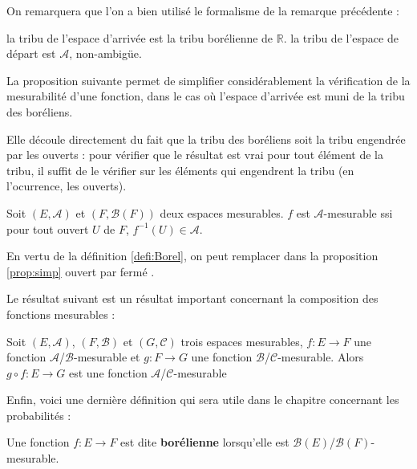 \documentclass[../integ-proba.tex]{subfiles}
\begin{document}
\begin{rem}
  On remarquera que l'on a bien utilisé le formalisme de la remarque précédente :
  \begin{itemize}
    \itemb la tribu de l'espace d'arrivée est la tribu borélienne de $\mathbb{R}$.
    \itemb la tribu de l'espace de départ est $\mathcal{A}$, non-ambigüe.
  \end{itemize}
\end{rem}

La proposition suivante permet de simplifier considérablement la vérification de la mesurabilité d'une fonction, dans le cas où l'espace d'arrivée est muni de la tribu des boréliens.

Elle découle directement du fait que la tribu des boréliens soit la tribu engendrée par les ouverts :
pour vérifier que le résultat est vrai pour tout élément de la tribu, il suffit de le vérifier sur les éléments qui engendrent la tribu (en l'ocurrence, les ouverts).

\begin{prop}
  \label{prop:simp}
  Soit $\left(E, \mathcal{A}\right)$ et $\left(F, \mathcal{B}(F)\right)$ deux espaces mesurables.
  $f$ est $\mathcal{A}$-mesurable ssi pour tout ouvert $U$ de $F$, $f^{-1}(U) \in \mathcal{A}$.
\end{prop}

\begin{rem}
  En vertu de la définition \ref{defi:Borel}, on peut remplacer dans la proposition \ref{prop:simp} \og ouvert \fg par \og fermé \fg.
\end{rem}

Le résultat suivant est un résultat important concernant la composition des fonctions mesurables :

\begin{prop}
  Soit $\left(E,\mathcal{A}\right)$, $\left(F,\mathcal{B}\right)$ et $\left(G,\mathcal{C}\right)$ trois espaces mesurables,
  $f : E \longrightarrow F$ une fonction $\mathcal{A}$/$\mathcal{B}$-mesurable et $g : F \longrightarrow G$ une fonction $\mathcal{B}$/$\mathcal{C}$-mesurable.
  Alors $g \circ f : E \longrightarrow G$ est une fonction $\mathcal{A}$/$\mathcal{C}$-mesurable
\end{prop}

Enfin, voici une dernière définition qui sera utile dans le chapitre concernant les probabilités :

\begin{defi}
  Une fonction $f:E\longrightarrow F$ est dite \textbf{borélienne} lorsqu'elle est $\mathcal{B}(E)$/$\mathcal{B}(F)$-mesurable.
\end{defi}
\end{document}
